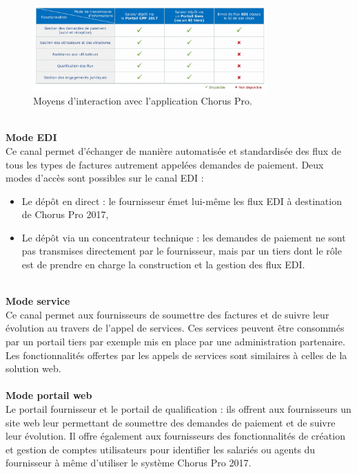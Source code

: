 \documentclass[12pt,a4paper]{article}
\begin{document}
\begin{figure}[H]
	\begin{center}
		\includegraphics[width=0.8\textwidth,height=\textheight,keepaspectratio]{tableauMoyensFonctionnalites.png}
		\caption{Moyens d'interaction avec l'application Chorus Pro.}
		\label{tableauMoyens}
	\end{center}
\end{figure}
~~\\
\textbf{Mode EDI}
~~\\
Ce canal permet d’échanger de manière automatisée et standardisée des flux de tous les types de factures autrement appelées demandes de paiement. Deux modes d’accès sont possibles sur le canal EDI :
\smallbreak
\begin{itemize}
\item Le dépôt en direct : le fournisseur émet lui-même les flux EDI à destination de Chorus Pro 2017,
\item Le dépôt via un concentrateur technique : les demandes de paiement ne sont pas transmises directement par le fournisseur, mais par un tiers dont le rôle est de prendre en charge la construction et la gestion des flux EDI. 
\end{itemize}
~~\\
\textbf{Mode service}
~~\\
Ce canal permet aux fournisseurs de soumettre des factures et de suivre leur évolution au travers de l'appel de services. Ces services peuvent être consommés par un portail tiers par exemple mis en place par une administration partenaire. Les fonctionnalités offertes par les appels de services sont similaires à celles de la solution web.
~~\\
~~\\
\textbf{Mode portail web}
~~\\
Le portail fournisseur et le portail de qualification : ils offrent aux fournisseurs un site web leur permettant de soumettre des demandes de paiement et de suivre leur évolution. Il offre également aux fournisseurs des fonctionnalités de création et gestion de comptes utilisateurs pour identifier les salariés ou agents du fournisseur à même d’utiliser le système Chorus Pro 2017.
\clearpage
\newpage
\end{document}
